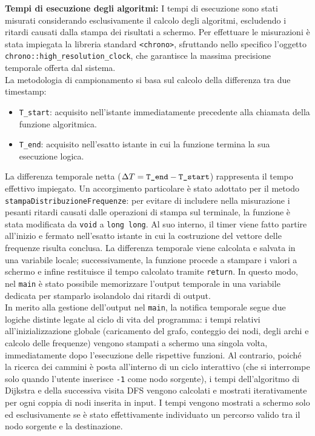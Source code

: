 \documentclass[12pt, a4paper]{article}
\begin{document}
{\large\textbf{Tempi di esecuzione degli algoritmi:}} I tempi di esecuzione sono stati misurati considerando esclusivamente il calcolo degli algoritmi, escludendo i ritardi causati dalla stampa dei risultati a schermo. Per effettuare le misurazioni è stata impiegata la libreria standard \texttt{<chrono>}, sfruttando nello specifico l'oggetto \texttt{chrono::high\_resolution\_clock}, che garantisce la massima precisione temporale offerta dal sistema. \\
La metodologia di campionamento si basa sul calcolo della differenza tra due timestamp:
\begin{itemize}
    \item[-] \texttt{T\_start}: acquisito nell'istante immediatamente precedente alla chiamata della funzione algoritmica.
    \item[-] \texttt{T\_end}: acquisito nell'esatto istante in cui la funzione termina la sua esecuzione logica.
\end{itemize}
La differenza temporale netta ($\Delta T = \mbox{\texttt{T\_end}} - \mbox{\texttt{T\_start}}$) rappresenta il tempo effettivo impiegato. Un accorgimento particolare è stato adottato per il metodo \texttt{stampaDistribuzioneFrequenze}: per evitare di includere nella misurazione i pesanti ritardi causati dalle operazioni di stampa sul terminale, la funzione è stata modificata da \texttt{void} a \texttt{long long}. Al suo interno, il timer viene fatto partire all'inizio e fermato nell'esatto istante in cui la costruzione del vettore delle frequenze risulta conclusa. La differenza temporale viene calcolata e salvata in una variabile locale; successivamente, la funzione procede a stampare i valori a schermo e infine restituisce il tempo calcolato tramite \texttt{return}. In questo modo, nel \texttt{main} è stato possibile memorizzare l'output temporale in una variabile dedicata per stamparlo isolandolo dai ritardi di output.\\
In merito alla gestione dell'output nel \texttt{main}, la notifica temporale segue due logiche distinte legate al ciclo di vita del programma: i tempi relativi all'inizializzazione globale (caricamento del grafo, conteggio dei nodi, degli archi e calcolo delle frequenze) vengono stampati a schermo una singola volta, immediatamente dopo l'esecuzione delle rispettive funzioni. Al contrario, poiché la ricerca dei cammini è posta all'interno di un ciclo interattivo (che si interrompe solo quando l'utente inserisce \texttt{-1} come nodo sorgente), i tempi dell'algoritmo di Dijkstra e della successiva visita DFS vengono calcolati e mostrati iterativamente per ogni coppia di nodi inserita in input. I tempi vengono mostrati a schermo solo ed esclusivamente se è stato effettivamente individuato un percorso valido tra il nodo sorgente e la destinazione. \\
\end{document}
